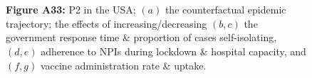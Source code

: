 \documentclass[paper=a4,fontsize=11pt]{article}
\begin{document}
\begin{figure}[!h]
  \\
  \hspace{1.76cm}
  \\
  \caption*{\textbf{Figure A33:} P2 in the USA; $(a)$ the counterfactual epidemic trajectory; the effects of increasing/decreasing $(b,c)$ the government response time \& proportion of cases self-isolating, $(d,e)$ adherence to NPIs during lockdown \& hospital capacity, and $(f,g)$ vaccine administration rate \& uptake.}
\end{figure}
\end{document}
